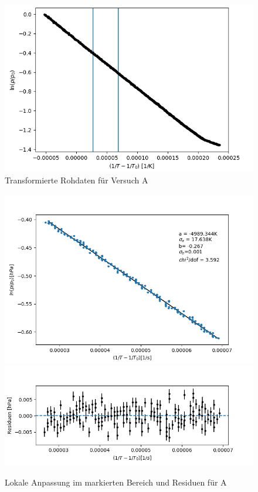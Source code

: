 \documentclass[12pt,a4paper]{article}
\begin{document}
\begin{figure}[H]
\includegraphics[width=\linewidth]{Bilder/log_RohdatenA.png}
\caption[Transformierte Daten A]{Transformierte Rohdaten für Versuch A}
\label{fig:logA}
\end{figure}

\begin{figure}
\includegraphics[width=\linewidth]{Bilder/lokaler_fit_2A.png}
\includegraphics[width=\linewidth]{Bilder/lokale_Residuen_2A}
\caption[Lokale Anpassung]{Lokale Anpassung im markierten Bereich und Residuen für A}
\label{fig:fit_2A}
\end{figure}
\end{document}
